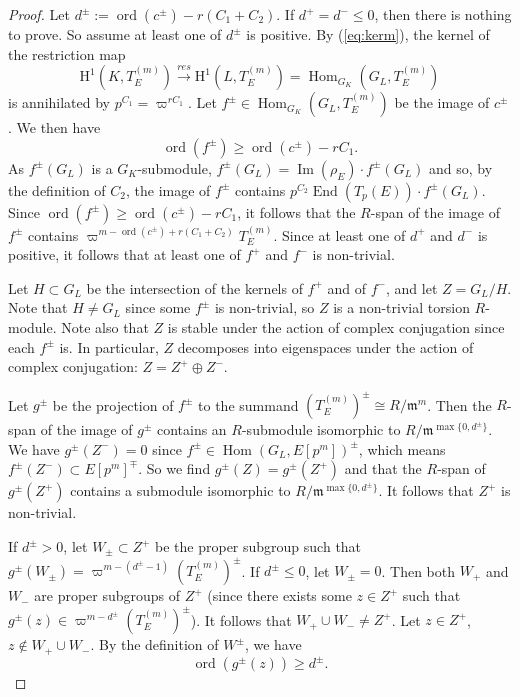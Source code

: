 \documentclass[a4paper,10pt]{amsart}
\numberwithin{equation}{section}
\numberwithin{equation}{section}
\theoremstyle{plain}
\theoremstyle{definition}
\theoremstyle{definition}
\theoremstyle{plain}
\theoremstyle{plain}
\theoremstyle{plain}
\theoremstyle{plain}
\DeclareMathOperator{\ord}{ord}
\newcommand{\Hom}{\operatorname{Hom}}
\DeclareMathOperator{\im}{Im}
\newcommand{\fm}{\mathfrak{m}}
\newcommand{\rH}{\mathrm{H}}
\begin{document}
\begin{proof}
Let $d^\pm:= \ord(c^{\pm}) - r(C_1 + C_2)$. If $d^+=d^-\leq 0$, then there is nothing to prove. So assume at least one of $d^\pm$ is positive. 
By (\ref{eq:kerm}), the kernel of the restriction map
$$
\rH^1(K,T_E^{(m)}) \stackrel{res}{\rightarrow} \rH^1(L,T_E^{(m)}) = \Hom_{G_K}(G_L,T_E^{(m)})
$$
is annihilated by $p^{C_1}=\varpi^{rC_1}$. Let $f^\pm\in \Hom_{G_K}(G_L,T_E^{(m)})$ be the image of $c^\pm$. We then have 
$$
\ord(f^\pm) \geq \ord(c^\pm) - rC_1.
$$
As $f^\pm(G_L)$ is a $G_K$-submodule, $f^\pm(G_L) = \im(\rho_E)\cdot f^\pm(G_L)$ and so, by the definition of $C_2$,
the image of $f^\pm$ contains $p^{C_2}\operatorname{End}(T_p(E))\cdot f^\pm(G_L)$. 
Since $\ord(f^\pm) \geq \ord(c^\pm) - rC_1$, it follows that the $R$-span of the image of $f^\pm$ contains $\varpi^{m-\ord(c^\pm) + r(C_1+C_2)} T_E^{(m)}$. 
Since at least one of $d^+$ and $d^-$ is positive, 
it follows that at least one of $f^+$ and $f^-$ is non-trivial. 

Let $H\subset G_L$ be the intersection of the kernels of $f^+$ and of $f^-$, and let $Z = G_L/H$. Note that $H\neq G_L$ since 
some $f^\pm$ is non-trivial, so $Z$ is a non-trivial torsion $R$-module. Note also that $Z$ is stable under the action of complex conjugation since each $f^\pm$ is.  In particular, $Z$ decomposes into eigenspaces under the action of complex conjugation: $Z= Z^+\oplus Z^-$. 

Let  $g^\pm$ be the projection of $f^\pm$ to the summand $(T_E^{(m)})^{\pm} \cong R/\fm^m$.
Then the $R$-span of the image of $g^\pm$ contains an $R$-submodule isomorphic to $R/\fm^{\max\{0,d^\pm\}}$. 
We have $g^\pm(Z^-)=0$ since $f^\pm\in \Hom(G_L,E[p^m])^{\pm}$, which means $f^\pm(Z^-)\subset E[p^m]^{\mp}$. So we find $g^{\pm}(Z) = g^{\pm}(Z^+)$ and
that the $R$-span of $g^\pm(Z^+)$ contains a submodule isomorphic to $R/\fm^{\max\{0,d^\pm\}}$. It follows
that $Z^+$ is non-trivial.

If $d^\pm>0$, let $W_\pm \subset Z^+$ be the proper subgroup such that $g^\pm(W_\pm) = \varpi^{m-(d^\pm-1)}(T_E^{(m)})^\pm$. 
If $d^\pm \leq 0$, let $W_\pm  = 0$. Then both $W_+$ and $W_-$ are proper subgroups of $Z^+$ (since there exists some $z\in Z^+$ such that $g^\pm(z)\in \varpi^{m-d^\pm}(T_E^{(m)})^\pm$). It follows that
$W_+\cup W_-\neq Z^+$.  Let $z\in Z^+$, $z\not\in W_+\cup W_-$. By the definition of $W^\pm$, we have
\begin{equation}\label{eq:ordnek}
\ord(g^\pm(z)) \geq d^\pm.
\end{equation}



\end{proof}
\end{document}
